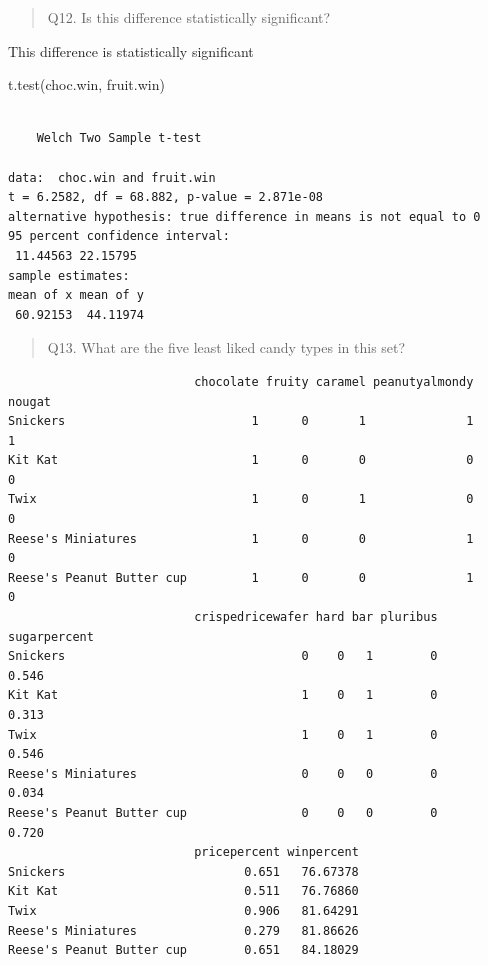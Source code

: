 \documentclass[
  letterpaper,
  DIV=11,
  numbers=noendperiod]{scrartcl}
\newenvironment{Shaded}{\begin{snugshade}}{\end{snugshade}}
\newcommand{\AttributeTok}[1]{\textcolor[rgb]{0.40,0.45,0.13}{#1}}
\newcommand{\DecValTok}[1]{\textcolor[rgb]{0.68,0.00,0.00}{#1}}
\newcommand{\FunctionTok}[1]{\textcolor[rgb]{0.28,0.35,0.67}{#1}}
\newcommand{\NormalTok}[1]{\textcolor[rgb]{0.00,0.23,0.31}{#1}}
\newcommand{\SpecialCharTok}[1]{\textcolor[rgb]{0.37,0.37,0.37}{#1}}
\begin{document}
\begin{quote}
Q12. Is this difference statistically significant?
\end{quote}

This difference is statistically significant

\begin{Shaded}
\begin{Highlighting}[]
\FunctionTok{t.test}\NormalTok{(choc.win, fruit.win)}
\end{Highlighting}
\end{Shaded}

\begin{verbatim}

    Welch Two Sample t-test

data:  choc.win and fruit.win
t = 6.2582, df = 68.882, p-value = 2.871e-08
alternative hypothesis: true difference in means is not equal to 0
95 percent confidence interval:
 11.44563 22.15795
sample estimates:
mean of x mean of y 
 60.92153  44.11974 
\end{verbatim}

\begin{quote}
Q13. What are the five least liked candy types in this set?
\end{quote}

\begin{Shaded}
\end{Shaded}

\begin{verbatim}
                          chocolate fruity caramel peanutyalmondy nougat
Snickers                          1      0       1              1      1
Kit Kat                           1      0       0              0      0
Twix                              1      0       1              0      0
Reese's Miniatures                1      0       0              1      0
Reese's Peanut Butter cup         1      0       0              1      0
                          crispedricewafer hard bar pluribus sugarpercent
Snickers                                 0    0   1        0        0.546
Kit Kat                                  1    0   1        0        0.313
Twix                                     1    0   1        0        0.546
Reese's Miniatures                       0    0   0        0        0.034
Reese's Peanut Butter cup                0    0   0        0        0.720
                          pricepercent winpercent
Snickers                         0.651   76.67378
Kit Kat                          0.511   76.76860
Twix                             0.906   81.64291
Reese's Miniatures               0.279   81.86626
Reese's Peanut Butter cup        0.651   84.18029
\end{verbatim}
\end{document}

